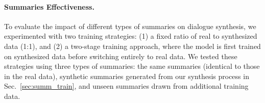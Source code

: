 


\paragraph{Summaries Effectiveness.}
To evaluate the impact of different types of summaries on dialogue synthesis, we experimented with two training strategies: (1) a fixed ratio of real to synthesized data (1:1), and (2) a two-stage training approach, where the model is first trained on synthesized data before switching entirely to real data. We tested these strategies using three types of summaries: the same summaries (identical to those in the real data), synthetic summaries generated from our synthesis process in Sec.~\ref{sec:summ_train}, and unseen summaries drawn from additional training data.

